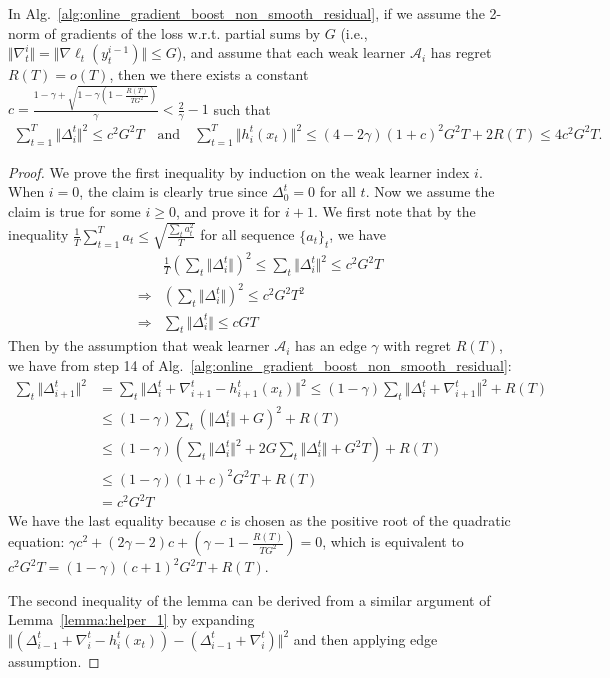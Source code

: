 \begin{lemma}
\label{lem:residual_shrink}
In Alg.~\ref{alg:online_gradient_boost_non_smooth_residual}, 
if we assume the 2-norm of gradients of the loss w.r.t. partial sums by $G$
(i.e., $\Vert \nabla _t^i \Vert = \Vert \nabla \ell _t(y^{i-1}_{t})\Vert \leq G$), 
and assume that each weak learner $\mathcal{A}_i$ has regret $R(T) = o(T)$, then we 
there exists a constant 
$c = \frac{1- \gamma + \sqrt{1 - \gamma (1 - \frac{R(T)}{TG^2})}}{\gamma} 
< \frac{2}{\gamma} - 1$ 
such that
\begin{align}
    \sum _{t=1}^T \Vert \Delta _i^t \Vert^2 \leq c^2G^2 T 
    \quad \text{and} \quad 
    \sum_{t=1}^T \Vert h^t_i(x_t) \Vert^2 \leq (4-2\gamma)(1+c)^2G^2T + 2R(T) \leq 4c^2G^2T.
\end{align}
\end{lemma}
\begin{proof}
We prove the first inequality by induction on the weak learner index $i$. When $i = 0$, the claim is clearly true since $\Delta _0  ^t = 0 $ for all $t$. Now we assume the claim is true for some $i \geq 0$, and prove it for $i+1$. We first note that by the inequality 
    $\frac{1}{T} \sum _{t=1}^T a_t  \leq \sqrt{ \frac{\sum _t a_t^2}{T} }$ for all sequence 
    $\{a_t \}_t$, we have 
\begin{align}
 &   \frac{1}{T} ( \sum _t \Vert \Delta _i^t \Vert )^2 
            \leq \sum _t \Vert \Delta _i^t \Vert^2 \leq c^2 G^2 T \\
\Rightarrow & 
    ( \sum _t \Vert \Delta _i^t \Vert ) ^2 \leq c^2G^2 T^2 \\
\Rightarrow & 
    \sum _t \Vert \Delta _i^t \Vert  \leq cGT
\end{align}
Then by the assumption that weak learner $\mathcal{A}_i$ has an edge $\gamma$ with 
regret $R(T)$, we have from step 14 of Alg.~\ref{alg:online_gradient_boost_non_smooth_residual}: 
\begin{align}
    \sum _t \Vert \Delta _{i+1}^t \Vert ^2 
    &= \sum _t \Vert \Delta _{i}^t + \nabla _{i+1}^t - h^t_{i+1}(x_t) \Vert ^2
        \leq (1-\gamma) \sum _t \Vert \Delta _{i}^t + \nabla _{i+1}^t \Vert^2 + R(T) \\
    &\leq (1-\gamma) \sum _t \left( \Vert \Delta_i^t \Vert + G \right)^2  + R(T) \\
    &\leq (1-\gamma) \left(\sum _t \Vert \Delta_i^t \Vert^2 + 
        2G \sum_t \Vert \Delta_i^t \Vert + G^2T \right) + R(T) \\
    &\leq (1-\gamma)(1+c)^2G^2T + R(T) \\
    &= c^2G^2T
\end{align}
We have the last equality because $c$ is chosen as the positive root of the 
quadratic equation: $\gamma c^2 + (2\gamma - 2) c + (\gamma -1 - \frac{R(T)}{TG^2}) = 0$, which is equivalent to $c^2G^2T = (1-\gamma)(c+1)^2G^2T + R(T)$. 

The second inequality of the lemma can be derived from a similar argument of Lemma~\ref{lemma:helper_1} by expanding 
$\Vert \left(\Delta_{i-1}^t + \nabla_{i}^t - h^t_i(x_t) \right) - \left(\Delta_{i-1}^t + \nabla_{i}^t\right) \Vert^2$ and then applying edge assumption. 
\end{proof}

